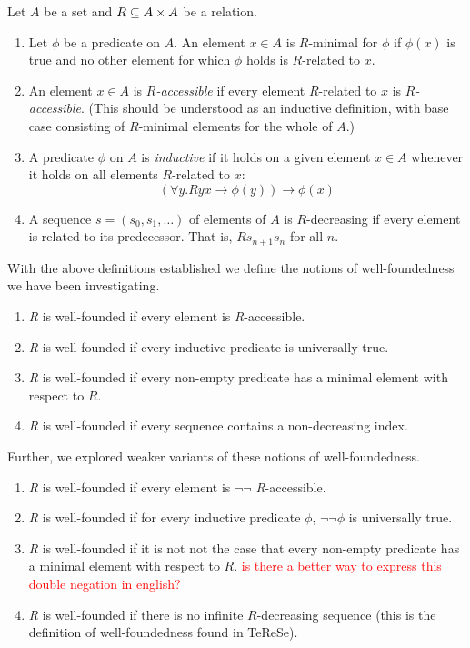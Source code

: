 \documentclass{scrartcl}
\begin{document}
\begin{dfn} Let $A$ be a set and $R \subseteq A \times A$ be a relation.
\begin{enumerate}
  \item Let $\phi$ be a predicate on $A$. An element $x \in A$ is $R$-minimal for $\phi$ if $\phi(x)$ is true and no other element for which $\phi$ holds is $R$-related to $x$.
  \item An element $x \in A$ is \textit{$R$-accessible} if every element $R$-related to $x$ is \textit{$R$-accessible}.  (This should be understood as an inductive definition, with base case consisting of $R$-minimal elements for the whole of $A$.)
    \item A predicate $\phi$ on $A$ is \emph{inductive} if it holds on a given element $x \in A$ whenever it holds on all elements $R$-related to $x$:
    \[ (\forall y. Ryx \to \phi(y)) \to \phi(x) \]
    \item A sequence $s = (s_0,s_1,\dots)$ of elements of $A$ is $R$-decreasing
    if every element is related to its predecessor.  That is, $Rs_{n+1}s_n$ for all $n$.
\end{enumerate}
\end{dfn}
With the above definitions established we define the notions of well-foundedness we have been investigating.
\begin{dfn} \hfil
  \begin{enumerate}
    \item \textit{R} is well-founded if every element is \textit{R}-accessible.
    \item \textit{R} is well-founded if every inductive predicate is universally true.
    \item \textit{R} is well-founded if every non-empty predicate has a minimal element with respect to $R$.
    \item \textit{R} is well-founded if every sequence contains a non-decreasing index.
  \end{enumerate}
\end{dfn}
  Further, we explored weaker variants of these notions of well-foundedness.
  \begin{dfn} \hfil
    \begin{enumerate}
      \item \textit{R} is well-founded if every element is $\lnot \lnot$  \textit{R}-accessible.
      \item \textit{R} is well-founded if for every inductive predicate $\phi$, $\lnot \lnot \phi$ is universally true.
      \item \textit{R} is well-founded if it is not not the case that every non-empty predicate has a minimal element with respect to $R$. \textcolor{red}{is there a better way to express this double negation in english?}
      \item \textit{R} is well-founded if there is no infinite $R$-decreasing sequence (this is the definition of well-foundedness found in TeReSe).
    \end{enumerate}
\end{dfn}
\end{document}
